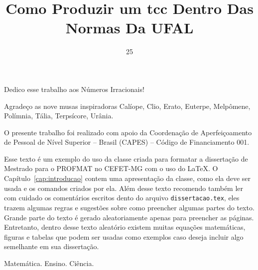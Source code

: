 \documentclass[fleqn]{profmat-cefet}
\title{Como Produzir um tcc Dentro Das Normas Da UFAL}
\date{25}{05}{2023}
\newcommand{\texfile}  {\texttt{dissertacao.tex}}
\begin{document}

\begin{dedication} 

Dedico esse trabalho aos Números Irracionais!

\end{dedication}

\begin{acknowledgement} 


\noindent
Agradeço as nove musas inspiradoras Calíope, Clio, Erato, Euterpe, Melpômene,
Polímnia, Tália, Terpsícore, Urânia.

%
%
\vspace{2\baselineskip}\noindent
O presente trabalho foi realizado com apoio da Coordenação de Aperfeiçoamento 
de Pessoal de Nível Superior -- Brasil (CAPES) -- Código de Financiamento 001.

\end{acknowledgement}

\begin{Resumo}


Esse texto é um exemplo do uso da classe criada para formatar
a dissertação de Mestrado para o PROFMAT no CEFET-MG com o uso do \LaTeX{}.
O Capítulo~\ref{cap:introducao} contem uma apresentação 
da classe, como ela deve ser usada e os comandos criados por 
ela. Além desse texto recomendo também ler com cuidado os comentários escritos
dento do arquivo \texfile{}, eles trazem algumas regras e 
sugestões sobre como preencher algumas partes do texto.
Grande parte do texto é gerado aleatoriamente apenas para preencher as páginas. 
Entretanto, dentro desse texto aleatório existem muitas equações matemáticas, 
figuras e tabelas que podem ser usadas como exemplos caso deseja incluir
algo semelhante em sua dissertação.

\PalavrasChave Matemática. Ensino. Ciência.

\end{Resumo}
\end{document}
